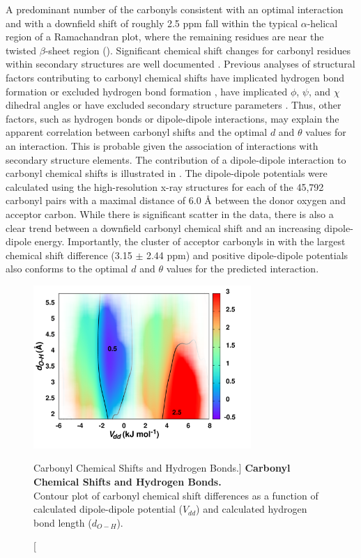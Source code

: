 \begin{doublespace}
A predominant number of the carbonyls consistent with an optimal \npistar{}
interaction and with a downfield shift of roughly 2.5 ppm fall within the
typical $\alpha$-helical region of a Ramachandran plot, where the remaining
residues are near the twisted $\beta$-sheet region
(). Significant chemical shift changes
for carbonyl residues within secondary structures are well
documented \cite{wang:protsci2002}. Previous analyses of structural
factors contributing to carbonyl \cnmr{} chemical shifts
have implicated hydrogen bond formation
\cite{dedios:sci1993,asakawa:jacs1992,wylie:jacs2007}
or excluded hydrogen bond formation
\cite{cisnetti:cpc2004,neal:jbnmr2003,markwick:jacs2004}, have
implicated $\phi$, $\psi$, and $\chi$ dihedral angles
\cite{neal:jbnmr2003} or have excluded secondary structure parameters
\cite{cisnetti:cpc2004,dedios:sci1993}. Thus, other factors,
such as hydrogen bonds or dipole-dipole interactions, may explain the apparent
correlation between carbonyl \cnmr{} shifts and the optimal $d$ and $\theta$
values for an \npistar{} interaction. This is probable given the association of
\npistar{} interactions with secondary structure elements. The contribution of
a dipole-dipole interaction to carbonyl \cnmr{} chemical shifts is illustrated
in . The dipole-dipole potentials were calculated
using the high-resolution x-ray structures for each of the 45,792 carbonyl
pairs with a maximal distance of 6.0 \r{A} between the donor oxygen and
acceptor carbon. While there is significant scatter in the data, there
is also a clear trend between a downfield carbonyl \cnmr{} chemical
shift and an increasing dipole-dipole energy. Importantly, the cluster
of acceptor carbonyls in  with the
largest \cnmr{} chemical shift difference (3.15 $\pm$ 2.44 ppm)
and positive dipole-dipole potentials also conforms to
the optimal $d$ and $\theta$ values for the predicted \npistar{} interaction.
\end{doublespace}

\begin{figure}
\includegraphics[width=3.25in]{figs/npistar/06-hbonds.png}
\caption
      [Carbonyl \cnmr{} Chemical Shifts and Hydrogen Bonds.]{
  {\bf Carbonyl \cnmr{} Chemical Shifts and Hydrogen Bonds.}
  \\
  Contour plot of \cnmr{} carbonyl chemical shift differences as a function
  of calculated dipole-dipole potential ($V_{dd}$) and calculated hydrogen
  bond length ($d_{O-H}$).
}
\label{figure.11.6}
\end{figure}


